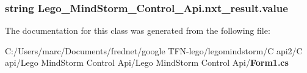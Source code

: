 \subsubsection[{value}]{\setlength{\rightskip}{0pt plus 5cm}string {\bf Lego\_\-MindStorm\_\-Control\_\-Api.nxt\_\-result.value}}\label{class_lego___mind_storm___control___api_1_1nxt__result_f7cd3aff794205cebd730ef8fa9beb8e}




The documentation for this class was generated from the following file:\begin{CompactItemize}
\item 
C:/Users/marc/Documents/frednet/google TFN-lego/legomindstorm/C api2/C api/Lego MindStorm Control Api/Lego MindStorm Control Api/{\bf Form1.cs}\end{CompactItemize}
